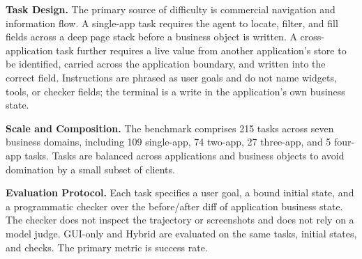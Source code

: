 \textbf{Task Design.}
The primary source of difficulty is commercial navigation and information flow. A single-app task requires the agent to locate, filter, and fill fields across a deep page stack before a business object is written. A cross-application task further requires a live value from another application's store to be identified, carried across the application boundary, and written into the correct field. Instructions are phrased as user goals and do not name widgets, tools, or checker fields; the terminal is a write in the application's own business state.

\textbf{Scale and Composition.}
The benchmark comprises 215 tasks across seven business domains, including 109 single-app, 74 two-app, 27 three-app, and 5 four-app tasks. Tasks are balanced across applications and business objects to avoid domination by a small subset of clients.


\textbf{Evaluation Protocol.}
Each task specifies a user goal, a bound initial state, and a programmatic checker over the before/after diff of application business state. The checker does not inspect the trajectory or screenshots and does not rely on a model judge. GUI-only and Hybrid are evaluated on the same tasks, initial states, and checks. The primary metric is success rate.
